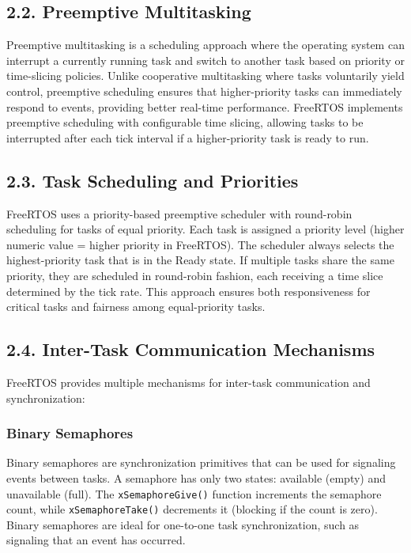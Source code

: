 \documentclass[12pt]{article}
\begin{document}
\subsection*{2.2. Preemptive Multitasking}

Preemptive multitasking is a scheduling approach where the operating system can interrupt a currently running task and switch to another task based on priority or time-slicing policies. Unlike cooperative multitasking where tasks voluntarily yield control, preemptive scheduling ensures that higher-priority tasks can immediately respond to events, providing better real-time performance. FreeRTOS implements preemptive scheduling with configurable time slicing, allowing tasks to be interrupted after each tick interval if a higher-priority task is ready to run.

\subsection*{2.3. Task Scheduling and Priorities}

FreeRTOS uses a priority-based preemptive scheduler with round-robin scheduling for tasks of equal priority. Each task is assigned a priority level (higher numeric value = higher priority in FreeRTOS). The scheduler always selects the highest-priority task that is in the Ready state. If multiple tasks share the same priority, they are scheduled in round-robin fashion, each receiving a time slice determined by the tick rate. This approach ensures both responsiveness for critical tasks and fairness among equal-priority tasks.

\subsection*{2.4. Inter-Task Communication Mechanisms}

FreeRTOS provides multiple mechanisms for inter-task communication and synchronization:

\subsubsection*{Binary Semaphores}

Binary semaphores are synchronization primitives that can be used for signaling events between tasks. A semaphore has only two states: available (empty) and unavailable (full). The \texttt{xSemaphoreGive()} function increments the semaphore count, while \texttt{xSemaphoreTake()} decrements it (blocking if the count is zero). Binary semaphores are ideal for one-to-one task synchronization, such as signaling that an event has occurred.
\end{document}
